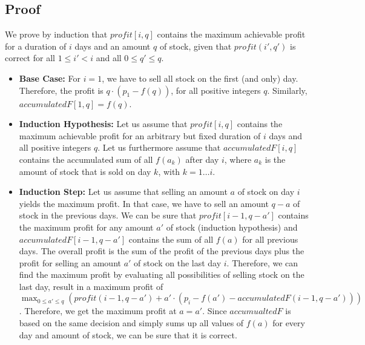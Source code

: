 \documentclass[12pt]{article}
\begin{document}
\subsection*{Proof}
We prove by induction that $\mathit{profit}[i, q]$ contains the maximum achievable profit for a duration of $i$ days and an amount $q$ of stock, given that $\mathit{profit}(i', q')$ is correct for all $1 \leq i' < i$ and all $0 \leq q' \leq q$.
\begin{itemize}
	\item \textbf{Base Case:} For $i=1$, we have to sell all stock on the first (and only) day. Therefore, the profit is $q \cdot (p_1 - f(q))$, for all positive integers $q$. Similarly, $\mathit{accumulatedF}[1, q] = f(q)$.
	\item \textbf{Induction Hypothesis:} Let us assume that $\mathit{profit}[i, q]$ contains the maximum achievable profit for an arbitrary but fixed duration of $i$ days and all positive integers $q$. Let us furthermore assume that $\mathit{accumulatedF}[i, q]$ contains the accumulated sum of all $f(a_k)$ after day $i$, where $a_k$ is the amount of stock that is sold on day $k$, with $k = 1 \ldots i$.
	\item \textbf{Induction Step:} Let us assume that selling an amount $a$ of stock on day $i$ yields the maximum profit. In that case, we have to sell an amount $q-a$ of stock in the previous days. We can be sure that $\mathit{profit}[i-1, q-a']$ contains the maximum profit for any amount $a'$ of stock (induction hypothesis) and $\mathit{accumulatedF}[i-1, q-a']$ contains the sum of all $f(a)$ for all previous days. The overall profit is the sum of the profit of the previous days plus the profit for selling an amount $a'$ of stock on the last day $i$. Therefore, we can find the maximum profit by evaluating all possibilities of selling stock on the last day, result in a maximum profit of $\max_{0 \leq a' \leq q} (\mathit{profit}(i-1, q-a') + a' \cdot (p_i - f(a') - \mathit{accumulatedF}(i-1, q-a')))$. Therefore, we get the maximum profit at $a=a'$. Since $\mathit{accumualtedF}$ is based on the same decision and simply sums up all values of $f(a)$ for every day and amount of stock, we can be sure that it is correct.
\end{itemize}
\end{document}
